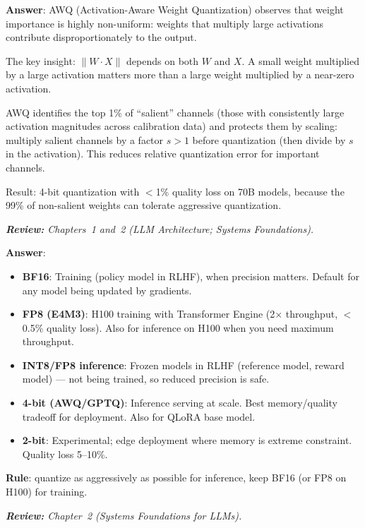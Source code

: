 \begin{questionbox}
\textbf{Answer}: AWQ (Activation-Aware Weight Quantization) observes that weight importance is highly non-uniform: weights that multiply large activations contribute disproportionately to the output.

The key insight: $\|W \cdot X\|$ depends on both $W$ and $X$. A small weight multiplied by a large activation matters more than a large weight multiplied by a near-zero activation.

AWQ identifies the top 1\% of ``salient'' channels (those with consistently large activation magnitudes across calibration data) and protects them by scaling: multiply salient channels by a factor $s > 1$ before quantization (then divide by $s$ in the activation). This reduces relative quantization error for important channels.

Result: 4-bit quantization with $<$1\% quality loss on 70B models, because the 99\% of non-salient weights can tolerate aggressive quantization.

\emph{\textbf{Review:} Chapters~1 and~2 (LLM Architecture; Systems Foundations).}
\end{questionbox}

\begin{questionbox}
\textbf{Answer}:

\begin{itemize}
  \item \textbf{BF16}: Training (policy model in RLHF), when precision matters. Default for any model being updated by gradients.
  \item \textbf{FP8 (E4M3)}: H100 training with Transformer Engine (2$\times$ throughput, $<$0.5\% quality loss). Also for inference on H100 when you need maximum throughput.
  \item \textbf{INT8/FP8 inference}: Frozen models in RLHF (reference model, reward model) --- not being trained, so reduced precision is safe.
  \item \textbf{4-bit (AWQ/GPTQ)}: Inference serving at scale. Best memory/quality tradeoff for deployment. Also for QLoRA base model.
  \item \textbf{2-bit}: Experimental; edge deployment where memory is extreme constraint. Quality loss 5--10\%.
\end{itemize}

\textbf{Rule}: quantize as aggressively as possible for inference, keep BF16 (or FP8 on H100) for training.

\emph{\textbf{Review:} Chapter~2 (Systems Foundations for LLMs).}
\end{questionbox}

